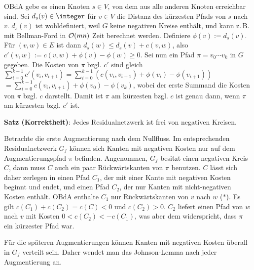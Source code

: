 \begin{Beweis}
    OBdA gebe es einen Knoten $s \in V$, von dem aus alle anderen Knoten erreichbar sind.
    Sei $d_s(v) \in \integer$ für $v \in V$ die Distanz des kürzesten Pfads von $s$ nach $v$.
    $d_s(v)$ ist wohldefiniert, weil $G$ keine negativen Kreise enthält,
    und kann z.\,B. mit Bellman-Ford in $\mathcal{O}(mn)$ Zeit berechnet werden.
    Definiere $\phi(v) := d_s(v)$.
    Für $(v, w) \in E$ ist dann $d_s(w) \le d_s(v) + c(v, w)$, also\\
    $c'(v, w) := c(v, w) + \phi(v) - \phi(w) \ge 0$.
    Sei nun ein Pfad $\pi = v_0 \dotsb v_k$ in $G$ gegeben.
    Die Kosten von $\pi$ bzgl. $c'$ sind gleich
    $\sum_{i=0}^{k-1} c'(v_i, v_{i+1})
    = \sum_{i=0}^{k-1} (c(v_i, v_{i+1}) + \phi(v_i) - \phi(v_{i+1}))$\\
    $= \sum_{i=0}^{k-1} c(v_i, v_{i+1}) + \phi(v_0) - \phi(v_k)$,
    wobei der erste Summand die Kosten von $\pi$ bzgl. $c$ darstellt.
    Damit ist $\pi$ am kürzesten bzgl. $c$ ist genau dann,
    wenn $\pi$ am kürzesten bzgl. $c'$ ist.
\end{Beweis}

\linie

\textbf{Satz (Korrektheit)}:
Jedes Residualnetzwerk ist frei von negativen Kreisen.

\begin{Beweis}
    Betrachte die erste Augmentierung nach dem Nullfluss.
    Im entsprechenden Residualnetzwerk $G_f$ können sich Kanten mit negativen Kosten nur auf dem
    Augmentierungspfad $\pi$ befinden.
    Angenommen, $G_f$ besitzt einen negativen Kreis $C$,
    dann muss $C$ auch ein paar Rückwärtskanten von $\pi$ benutzen.
    $C$ lässt sich daher zerlegen in einen Pfad $C_1$,
    der mit einer Kante mit negativen Kosten beginnt und endet,
    und einen Pfad $C_2$, der nur Kanten mit nicht-negativen Kosten enthält.
    OBdA enthalte $C_1$ nur Rückwärtskanten von $v$ nach $w$ ($\ast$).
    Es gilt $c(C_1) + c(C_2) = c(C) < 0$ und $c(C_2) > 0$.
    $C_2$ liefert einen Pfad von $w$ nach $v$ mit Kosten $0 < c(C_2) < -c(C_1)$,
    was aber dem widerspricht, dass $\pi$ ein kürzester Pfad war.

    Für die späteren Augmentierungen können Kanten mit negativen Kosten überall in $G_f$ verteilt
    sein.
    Daher wendet man das Johnson-Lemma nach jeder Augmentierung an.
\end{Beweis}

\linie
\pagebreak

